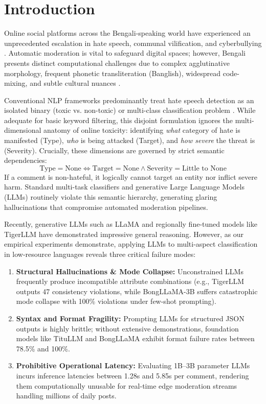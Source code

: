 \documentclass[conference]{IEEEtran}
\begin{document}
\section{Introduction}
Online social platforms across the Bengali-speaking world have experienced an unprecedented escalation in hate speech, communal vilification, and cyberbullying \cite{islam2021bangla, romim2022bdshs}. Automatic moderation is vital to safeguard digital spaces; however, Bengali presents distinct computational challenges due to complex agglutinative morphology, frequent phonetic transliteration (Banglish), widespread code-mixing, and subtle cultural nuances \cite{romero2019bengali, sazzed2021vulgarity}.

Conventional NLP frameworks predominantly treat hate speech detection as an isolated binary (toxic vs. non-toxic) or multi-class classification problem \cite{romero2021hate, karim2020deephateexplainer}. While adequate for basic keyword filtering, this disjoint formulation ignores the multi-dimensional anatomy of online toxicity: identifying \textit{what} category of hate is manifested (Type), \textit{who} is being attacked (Target), and \textit{how severe} the threat is (Severity). Crucially, these dimensions are governed by strict semantic dependencies:
\begin{equation}
\text{Type} = \text{None} \iff \text{Target} = \text{None} \land \text{Severity} = \text{Little to None}
\label{eq:semantic_rule}
\end{equation}
If a comment is non-hateful, it logically cannot target an entity nor inflict severe harm. Standard multi-task classifiers and generative Large Language Models (LLMs) routinely violate this semantic hierarchy, generating glaring hallucinations that compromise automated moderation pipelines.

Recently, generative LLMs such as LLaMA \cite{touvron2023llama} and regionally fine-tuned models like TigerLLM \cite{nishat2025tigerllm, raihan2025tigerllm} have demonstrated impressive general reasoning. However, as our empirical experiments demonstrate, applying LLMs to multi-aspect classification in low-resource languages reveals three critical failure modes:
\begin{enumerate}
    \item \textbf{Structural Hallucinations \& Mode Collapse:} Unconstrained LLMs frequently produce incompatible attribute combinations (e.g., TigerLLM outputs 47 consistency violations, while BongLLaMA-3B suffers catastrophic mode collapse with 100\% violations under few-shot prompting).
    \item \textbf{Syntax and Format Fragility:} Prompting LLMs for structured JSON outputs is highly brittle; without extensive demonstrations, foundation models like TituLLM and BongLLaMA exhibit format failure rates between 78.5\% and 100\%.
    \item \textbf{Prohibitive Operational Latency:} Evaluating 1B--3B parameter LLMs incurs inference latencies between 1.28s and 5.85s per comment, rendering them computationally unusable for real-time edge moderation streams handling millions of daily posts.
\end{enumerate}
\end{document}
